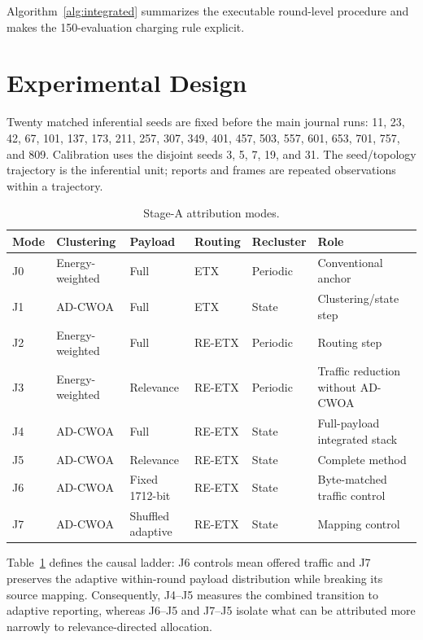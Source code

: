 \documentclass[pdflatex,sn-mathphys-num]{sn-jnl}
\begin{document}
Algorithm~\ref{alg:integrated} summarizes the executable round-level procedure and makes the 150-evaluation charging rule explicit.

\section{Experimental Design}

Twenty matched inferential seeds are fixed before the main journal runs:
11, 23, 42, 67, 101, 137, 173, 211, 257, 307, 349, 401, 457, 503, 557, 601, 653, 701, 757, and 809. Calibration uses the disjoint seeds 3, 5, 7, 19, and 31. The seed/topology trajectory is the inferential unit; reports and frames are repeated observations within a trajectory.

\begin{table}[t]
\caption{Stage-A attribution modes.}
\label{tab:modes}
\centering
\scriptsize
\begin{tabularx}{\textwidth}{l l l l l X}
\toprule
Mode & Clustering & Payload & Routing & Recluster & Role\\
\midrule
J0 & Energy-weighted & Full & ETX & Periodic & Conventional anchor\\
J1 & AD-CWOA & Full & ETX & State & Clustering/state step\\
J2 & Energy-weighted & Full & RE-ETX & Periodic & Routing step\\
J3 & Energy-weighted & Relevance & RE-ETX & Periodic & Traffic reduction without AD-CWOA\\
J4 & AD-CWOA & Full & RE-ETX & State & Full-payload integrated stack\\
J5 & AD-CWOA & Relevance & RE-ETX & State & Complete method\\
J6 & AD-CWOA & Fixed 1712-bit & RE-ETX & State & Byte-matched traffic control\\
J7 & AD-CWOA & Shuffled adaptive & RE-ETX & State & Mapping control\\
\bottomrule
\end{tabularx}
\end{table}

Table~\ref{tab:modes} defines the causal ladder: J6 controls mean offered traffic and J7 preserves the adaptive within-round payload distribution while breaking its source mapping. Consequently, J4--J5 measures the combined transition to adaptive reporting, whereas J6--J5 and J7--J5 isolate what can be attributed more narrowly to relevance-directed allocation.
\end{document}
